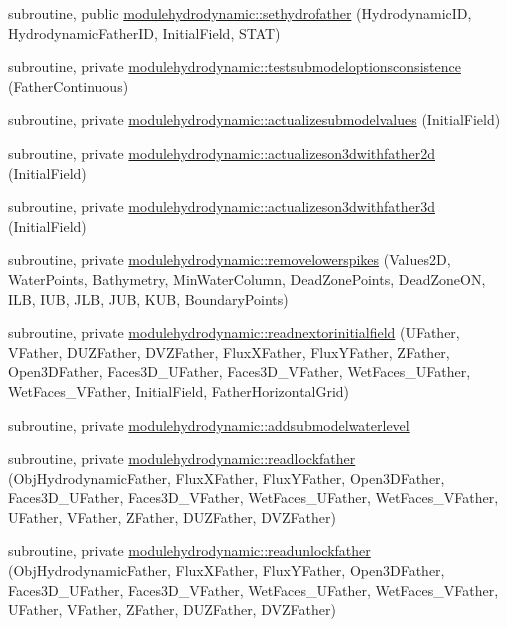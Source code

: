 \begin{DoxyCompactItemize}
subroutine, public \mbox{\hyperlink{namespacemodulehydrodynamic_abc9bf4137583800ad278abc052b5de37}{modulehydrodynamic\+::sethydrofather}} (Hydrodynamic\+ID, Hydrodynamic\+Father\+ID, Initial\+Field, S\+T\+AT)
\item 
subroutine, private \mbox{\hyperlink{namespacemodulehydrodynamic_ab0672dab245838d200adce9cad0f729e}{modulehydrodynamic\+::testsubmodeloptionsconsistence}} (Father\+Continuous)
\item 
subroutine, private \mbox{\hyperlink{namespacemodulehydrodynamic_a6c99419ab0bd5db0c25f899c10d86020}{modulehydrodynamic\+::actualizesubmodelvalues}} (Initial\+Field)
\item 
subroutine, private \mbox{\hyperlink{namespacemodulehydrodynamic_a22559e3146696632ddf4733faac3f167}{modulehydrodynamic\+::actualizeson3dwithfather2d}} (Initial\+Field)
\item 
subroutine, private \mbox{\hyperlink{namespacemodulehydrodynamic_af75db98fe37a03b0a927c6e2799e2b13}{modulehydrodynamic\+::actualizeson3dwithfather3d}} (Initial\+Field)
\item 
subroutine, private \mbox{\hyperlink{namespacemodulehydrodynamic_aa08df6c812db6e473c13d11473d2c1ad}{modulehydrodynamic\+::removelowerspikes}} (Values2D, Water\+Points, Bathymetry, Min\+Water\+Column, Dead\+Zone\+Points, Dead\+Zone\+ON, I\+LB, I\+UB, J\+LB, J\+UB, K\+UB, Boundary\+Points)
\item 
subroutine, private \mbox{\hyperlink{namespacemodulehydrodynamic_af6d2413608971031e8650e99548abfc7}{modulehydrodynamic\+::readnextorinitialfield}} (U\+Father, V\+Father, D\+U\+Z\+Father, D\+V\+Z\+Father, Flux\+X\+Father, Flux\+Y\+Father, Z\+Father, Open3\+D\+Father, Faces3\+D\+\_\+\+U\+Father, Faces3\+D\+\_\+\+V\+Father, Wet\+Faces\+\_\+\+U\+Father, Wet\+Faces\+\_\+\+V\+Father, Initial\+Field, Father\+Horizontal\+Grid)
\item 
subroutine, private \mbox{\hyperlink{namespacemodulehydrodynamic_aab2200414765344d596b6ebaadc2fa4a}{modulehydrodynamic\+::addsubmodelwaterlevel}}
\item 
subroutine, private \mbox{\hyperlink{namespacemodulehydrodynamic_afdbd6a69d8a99bcbad6b5c090639bc1b}{modulehydrodynamic\+::readlockfather}} (Obj\+Hydrodynamic\+Father, Flux\+X\+Father, Flux\+Y\+Father, Open3\+D\+Father, Faces3\+D\+\_\+\+U\+Father, Faces3\+D\+\_\+\+V\+Father, Wet\+Faces\+\_\+\+U\+Father, Wet\+Faces\+\_\+\+V\+Father, U\+Father, V\+Father, Z\+Father, D\+U\+Z\+Father, D\+V\+Z\+Father)
\item 
subroutine, private \mbox{\hyperlink{namespacemodulehydrodynamic_afeaf24401841ea327d58dcaa1b45a92f}{modulehydrodynamic\+::readunlockfather}} (Obj\+Hydrodynamic\+Father, Flux\+X\+Father, Flux\+Y\+Father, Open3\+D\+Father, Faces3\+D\+\_\+\+U\+Father, Faces3\+D\+\_\+\+V\+Father, Wet\+Faces\+\_\+\+U\+Father, Wet\+Faces\+\_\+\+V\+Father, U\+Father, V\+Father, Z\+Father, D\+U\+Z\+Father, D\+V\+Z\+Father)

\end{DoxyCompactItemize}
